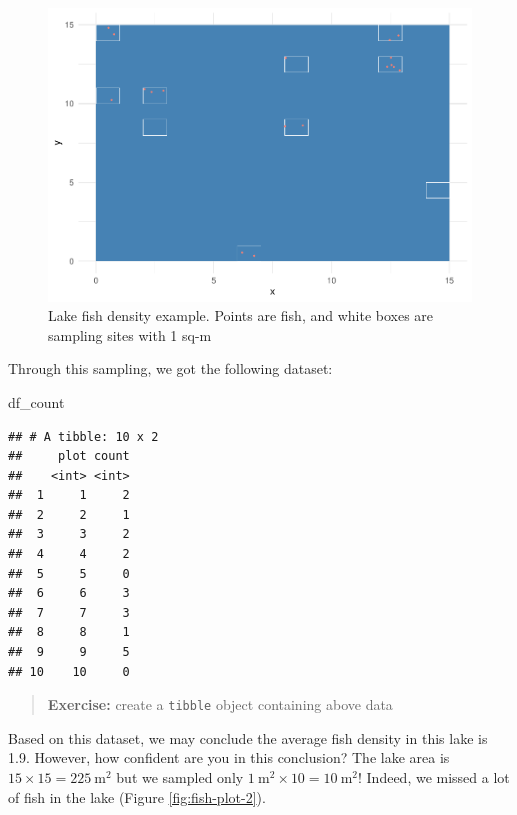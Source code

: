 \documentclass[
]{book}
\newenvironment{Shaded}{\begin{snugshade}}{\end{snugshade}}
\newcommand{\NormalTok}[1]{#1}
\begin{document}
\begin{figure}

{\centering \includegraphics{_main_files/figure-latex/fish-plot-1} 

}

\caption{Lake fish density example. Points are fish, and white boxes are sampling sites with 1 sq-m}\label{fig:fish-plot}
\end{figure}

Through this sampling, we got the following dataset:

\begin{Shaded}
\begin{Highlighting}[]
\NormalTok{df\_count}
\end{Highlighting}
\end{Shaded}

\begin{verbatim}
## # A tibble: 10 x 2
##     plot count
##    <int> <int>
##  1     1     2
##  2     2     1
##  3     3     2
##  4     4     2
##  5     5     0
##  6     6     3
##  7     7     3
##  8     8     1
##  9     9     5
## 10    10     0
\end{verbatim}

\begin{quote}
\textbf{Exercise:} create a \texttt{tibble} object containing above data
\end{quote}

Based on this dataset, we may conclude the average fish density in this lake is 1.9. However, how confident are you in this conclusion? The lake area is \(15 \times 15 = 225~\text{m}^2\) but we sampled only \(1~\text{m}^2 \times 10 = 10~\text{m}^2\)! Indeed, we missed a lot of fish in the lake (Figure \ref{fig:fish-plot-2}).
\end{document}
